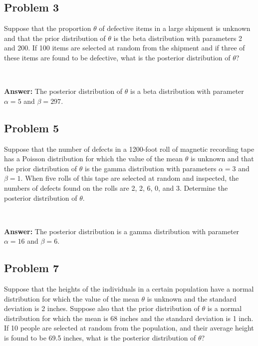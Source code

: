 \documentclass{article}
\begin{document}
\bigskip

\subsection*{Problem 3}
Suppose that the proportion $\theta$ of defective items in a large shipment is unknown and that the prior distribution of $\theta$ is the beta distribution with parameters 2 and 200. If 100 items are selected at random from the shipment and if three of these items are found to be defective, what is the posterior distribution of $\theta$?

\

\textbf{Answer:} The posterior distribution of $\theta$ is a beta distribution with parameter $\alpha = 5$ and $\beta = 297$.

\bigskip

\subsection*{Problem 5}
Suppose that the number of defects in a 1200-foot roll of magnetic recording tape has a Poisson distribution for which the value of the mean $\theta$ is unknown and that the prior distribution of $\theta$ is the gamma distribution with parameters $\alpha = 3$ and $\beta = 1$. When five rolls of this tape are selected at random and inspected, the numbers of defects found on the rolls are 2, 2, 6, 0, and 3. Determine the posterior distribution of $\theta$.

\

\textbf{Answer:} The posterior distribution is a gamma distribution with parameter $\alpha = 16$ and $\beta = 6$.

\bigskip

\subsection*{Problem 7}
Suppose that the heights of the individuals in a certain population have a normal distribution for which the value of the mean $\theta$ is unknown and the standard deviation is 2 inches. Suppose also that the prior distribution of $\theta$ is a normal distribution for which the mean is 68 inches and the standard deviation is 1 inch. If 10 people are selected at random from the population, and their average height is found to be 69.5 inches, what is the posterior distribution of $\theta$?
\end{document}
